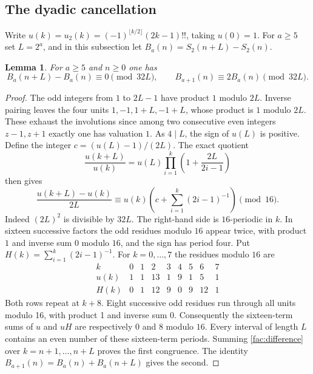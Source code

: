 \documentclass[11pt]{article}
\newtheorem{lemma}[theorem]{Lemma}
\theoremstyle{remark}\newtheorem{remark}[theorem]{Remark}
\begin{document}
\subsection{The dyadic cancellation}
Write $u(k)=u_2(k)=(-1)^{\lfloor k/2\rfloor}(2k-1)!!$, taking
$u(0)=1$. For $a\ge5$ set $L=2^a$, and in this subsection let
$B_a(n)=S_2(n+L)-S_2(n)$.
\begin{lemma}\label{fac:block}
For $a\ge5$ and $n\ge0$ one has
\[
 B_a(n+L)-B_a(n)\equiv0\pmod{32L},\qquad
 B_{a+1}(n)\equiv2B_a(n)\pmod{32L}.
\]
\end{lemma}
\begin{proof}
The odd integers from $1$ to $2L-1$ have product $1$ modulo $2L$.
Inverse pairing leaves the four units $1,-1,1+L,-1+L$, whose product
is $1$ modulo $2L$. These exhaust the involutions since among two
consecutive even integers $z-1,z+1$ exactly one has valuation $1$.
As $4\mid L$, the sign of $u(L)$ is positive. Define the integer
$c=(u(L)-1)/(2L)$. The exact quotient
\[
 \frac{u(k+L)}{u(k)}=u(L)\prod_{i=1}^k
 \left(1+\frac{2L}{2i-1}\right)
\]
then gives
\begin{equation}\label{fac:difference}
 \frac{u(k+L)-u(k)}{2L}
 \equiv u(k)\left(c+\sum_{i=1}^k(2i-1)^{-1}\right)\pmod{16}.
\end{equation}
Indeed $(2L)^2$ is divisible by $32L$. The right-hand side is
$16$-periodic in $k$. In sixteen successive factors the odd residues
modulo $16$ appear twice, with product $1$ and inverse sum $0$
modulo $16$, and the sign has period four. Put $H(k)=\sum_{i=1}^k(2i-1)^{-1}$.
For $k=0,\ldots,7$ the residues modulo $16$ are
\[
\begin{array}{c|rrrrrrrr}
 k &0&1&2&3&4&5&6&7\\ \hline
 u(k)&1&1&13&1&9&1&5&1\\
 H(k)&0&1&12&9&0&9&12&1
\end{array}
\]
Both rows repeat at $k+8$. Eight successive odd residues run through
all units modulo 16, with product 1 and inverse sum 0.
Consequently the sixteen-term sums of $u$ and $uH$ are respectively
$0$ and $8$ modulo $16$. Every interval of length $L$ contains an
even number of these sixteen-term periods. Summing
\eqref{fac:difference} over $k=n+1,\ldots,n+L$ proves the first
congruence. The identity $B_{a+1}(n)=B_a(n)+B_a(n+L)$ gives the
second.
\end{proof}
\end{document}

